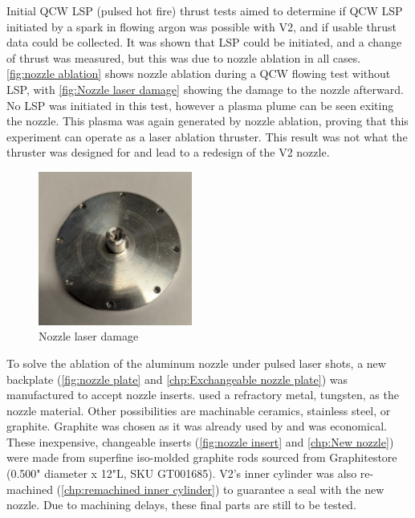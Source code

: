 Initial QCW LSP (pulsed hot fire) thrust tests aimed to determine if QCW LSP initiated by a spark in flowing argon was possible with V2, and if usable thrust data could be collected. It was shown that LSP could be initiated, and a change of thrust was measured, but this was due to nozzle ablation in all cases. \autoref{fig:nozzle ablation} shows nozzle ablation during a QCW flowing test without LSP, with \autoref{fig:Nozzle laser damage} showing the damage to the nozzle afterward. No LSP was initiated in this test, however a plasma plume can be seen exiting the nozzle. This plasma was again generated by nozzle ablation, proving that this experiment can operate as a laser ablation thruster. This result was not what the thruster was designed for and lead to a redesign of the V2 nozzle.

\begin{figure}[!ht]
    \centering
    \includegraphics[width=0.45\textwidth]{assets/4 experiments/Nozzle damage.jpg}
    \caption{Nozzle laser damage}
    \label{fig:Nozzle laser damage}
\end{figure}

To solve the ablation of the aluminum nozzle under pulsed laser shots, a new backplate (\autoref{fig:nozzle plate} and \autoref{chp:Exchangeable nozzle plate}) was manufactured to accept nozzle inserts. \textcite{toyodaThrustPerformanceCW2002} used a refractory metal, tungsten, as the nozzle material. Other possibilities are machinable ceramics, stainless steel, or graphite. Graphite was chosen as it was already used by \textcite{shojiLaserheatedRocketThruster1977} and was economical. These inexpensive, changeable inserts (\autoref{fig:nozzle insert} and \autoref{chp:New nozzle}) were made from superfine iso-molded graphite rods sourced from Graphitestore (0.500" diameter x 12"L, SKU GT001685). V2's inner cylinder was also re-machined (\autoref{chp:remachined inner cylinder}) to guarantee a seal with the new nozzle. Due to machining delays, these final parts are still to be tested.


